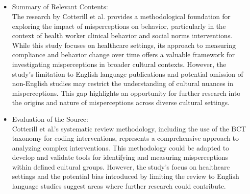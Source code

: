 \documentclass{article}
\begin{document}
\subsection{}
\begin{itemize}
    \item Summary of Relevant Contents:\\
The research by Cotterill et al. provides a methodological foundation for exploring the impact of misperceptions on behavior, particularly in the context of health worker clinical behavior and social norms interventions. While this study focuses on healthcare settings, its approach to measuring compliance and behavior change over time offers a valuable framework for investigating misperceptions in broader cultural contexts. However, the study's limitation to English language publications and potential omission of non-English studies may restrict the understanding of cultural nuances in misperceptions. This gap highlights an opportunity for further research into the origins and nature of misperceptions across diverse cultural settings.
\end{itemize}
\begin{itemize}
    \item Evaluation of the Source:\\
Cotterill et al.'s systematic review methodology, including the use of the BCT taxonomy for coding interventions, represents a comprehensive approach to analyzing complex interventions. This methodology could be adapted to develop and validate tools for identifying and measuring misperceptions within defined cultural groups. However, the study's focus on healthcare settings and the potential bias introduced by limiting the review to English language studies suggest areas where further research could contribute.
\end{itemize}
\end{document}
